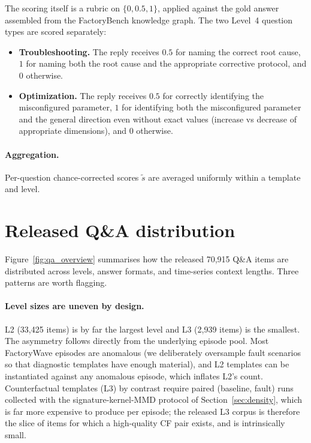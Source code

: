 \documentclass{article}
\begin{document}
The scoring itself is a rubric on $\{0, 0.5, 1\}$, applied against the gold answer assembled from the FactoryBench knowledge graph. The two Level~4 question types are scored separately:

\begin{itemize}
    \item \textbf{Troubleshooting.} The reply receives $0.5$ for naming the correct root cause, $1$ for naming both the root cause and the appropriate corrective protocol, and $0$ otherwise.
    \item \textbf{Optimization.} The reply receives $0.5$ for correctly identifying the misconfigured parameter, $1$ for identifying both the misconfigured parameter and the general direction even without exact values (increase vs decrease of appropriate dimensions), and $0$ otherwise.
\end{itemize}

\paragraph{Aggregation.} Per-question chance-corrected scores $\tilde{s}$ are averaged uniformly within a template and level.

\section{Released Q\&A distribution}
\label{app:qa_distribution}

Figure~\ref{fig:qa_overview} summarises how the released 70{,}915 Q\&A items are distributed across levels, answer formats, and time-series context lengths. Three patterns are worth flagging.

\paragraph{Level sizes are uneven by design.} L2 (33{,}425 items) is by far the largest level and L3 (2{,}939 items) is the smallest. The asymmetry follows directly from the underlying episode pool. Most FactoryWave episodes are anomalous (we deliberately oversample fault scenarios so that diagnostic templates have enough material), and L2 templates can be instantiated against any anomalous episode, which inflates L2's count. Counterfactual templates (L3) by contrast require paired (baseline, fault) runs collected with the signature-kernel-MMD protocol of Section~\ref{sec:density}, which is far more expensive to produce per episode; the released L3 corpus is therefore the slice of items for which a high-quality CF pair exists, and is intrinsically small.
\end{document}
